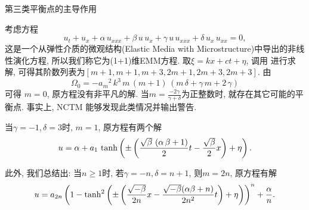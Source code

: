 \begin{example} 第三类平衡点的主导作用 

考虑方程 \cite{EMM}
\begin{equation}
    {{u}_{t}}+{{u}_{x}}+\alpha\,{{u}_{xxx}}+\beta\,u\,{{u}_{x}}+\gamma\,u\,{{u}_{xxx}}+\delta\,{{u}_{x}}\,{{u}_{xx}}=0,
\end{equation}
这是一个从弹性介质的微观结构(Elastic Media with Microstructure)中导出的非线性演化方程, 所以我们称它为(1+1)维EMM方程. 取$\xi=kx+ct+\eta$, 调用  进行求解, 可得其阶数列表为$[m+1,m+1,m+3,2m+1,2m+3,2m+3]$. 由
\begin{equation}
    \Omega_0=-{{{a}_{m}}}^{2}\,{k}^{3}\,m\,\left( m+1\right) \,\left( m\,\delta+\gamma\,m+2\,\gamma\right)
\end{equation}
可得 $m=0$, 原方程没有非平凡的解. 当$m=\frac{-2 \gamma}{\gamma+\delta}$为正整数时, 就存在其它可能的平衡点.  事实上, NCTM 能够发现此类情况并输出警告. 

当$\gamma=-1,\delta=3$时, $m=1$, 原方程有两个解 
\begin{equation}
u=\alpha+{{a}_{1}}\,\tanh\left(\pm\left(\frac{\sqrt {\beta}\,\left( \alpha\,\beta+1\right)}{2}t-\frac{\sqrt {\beta}}{2}x\right)+\eta\right) . \label{emm-tanh-1}
\end{equation}

此外, 我们总结出: 当$n\ge 1$时, 若$\gamma=-n,\delta=n+1$, 则$m=2n$, 原方程有解
\begin{equation}
u=a_{2n} \left(1-\tanh^2\left(\pm\left(\frac{\sqrt{-\beta}}{2n}x-\frac{\sqrt{-\beta}(\alpha\beta+n)}{2n^2}t\right)+\eta\right)\right)^n+\frac{\alpha}{n} . \label{emm-tanh-n}
\end{equation}


\end{example}
